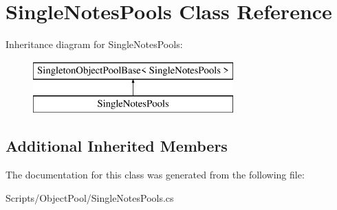 \hypertarget{class_single_notes_pools}{}\section{Single\+Notes\+Pools Class Reference}
\label{class_single_notes_pools}
Inheritance diagram for Single\+Notes\+Pools\+:\begin{figure}[H]
\begin{center}
\leavevmode
\includegraphics[height=2.000000cm]{class_single_notes_pools}
\end{center}
\end{figure}
\subsection*{Additional Inherited Members}


The documentation for this class was generated from the following file\+:\begin{DoxyCompactItemize}
\item 
Scripts/\+Object\+Pool/Single\+Notes\+Pools.\+cs\end{DoxyCompactItemize}
